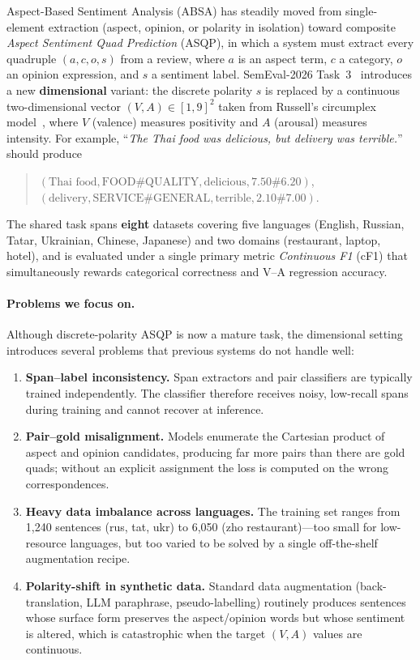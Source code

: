 \documentclass[runningheads]{llncs}
\begin{document}
Aspect-Based Sentiment Analysis (ABSA) has steadily moved from
single-element extraction (aspect, opinion, or polarity in isolation)
toward composite \emph{Aspect Sentiment Quad Prediction} (ASQP), in
which a system must extract every quadruple
$(a, c, o, s)$ from a review, where $a$ is an aspect term, $c$ a
category, $o$ an opinion expression, and $s$ a sentiment label.
SemEval-2026 Task~3~\cite{dimabsa2026} introduces a new
\textbf{dimensional} variant: the discrete polarity $s$ is replaced by
a continuous two-dimensional vector $(V, A) \in [1,9]^2$ taken from
Russell's circumplex model~\cite{russell1980circumplex}, where $V$
(valence) measures positivity and $A$ (arousal) measures intensity.
For example, ``\textit{The Thai food was delicious, but delivery was
terrible.}'' should produce
\begin{quote}\small
$(\text{Thai food}, \text{FOOD\#QUALITY}, \text{delicious}, 7.50\#6.20)$,\\
$(\text{delivery}, \text{SERVICE\#GENERAL}, \text{terrible}, 2.10\#7.00)$.
\end{quote}
The shared task spans \textbf{eight} datasets covering five languages
(English, Russian, Tatar, Ukrainian, Chinese, Japanese) and two domains
(restaurant, laptop, hotel), and is evaluated under a single primary
metric \emph{Continuous F1} (cF1) that simultaneously rewards
categorical correctness and V--A regression accuracy.

\paragraph{Problems we focus on.}
Although discrete-polarity ASQP is now a mature task, the dimensional
setting introduces several problems that previous systems do not
handle well:
\begin{enumerate}[itemsep=2pt,topsep=2pt,leftmargin=*]
  \item \textbf{Span--label inconsistency.} Span extractors and pair
    classifiers are typically trained independently. The classifier
    therefore receives noisy, low-recall spans during training and
    cannot recover at inference.
  \item \textbf{Pair--gold misalignment.} Models enumerate the
    Cartesian product of aspect and opinion candidates, producing far
    more pairs than there are gold quads; without an explicit
    assignment the loss is computed on the wrong correspondences.
  \item \textbf{Heavy data imbalance across languages.} The training
    set ranges from 1{,}240 sentences (rus, tat, ukr) to 6{,}050 (zho
    restaurant)---too small for low-resource languages, but too varied
    to be solved by a single off-the-shelf augmentation recipe.
  \item \textbf{Polarity-shift in synthetic data.} Standard data
    augmentation (back-translation, LLM paraphrase, pseudo-labelling)
    routinely produces sentences whose surface form preserves the
    aspect/opinion words but whose sentiment is altered, which is
    catastrophic when the target $(V, A)$ values are continuous.
\end{enumerate}
\end{document}
